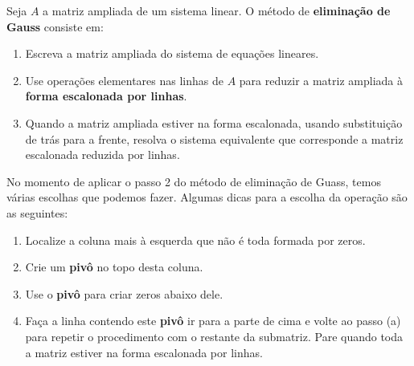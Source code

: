 \begin{definicao}
    Seja $A$ a matriz ampliada de um sistema linear. O método de \textbf{eliminação de Gauss} consiste em:
    \begin{enumerate}[label={\roman*})]
        \item Escreva a matriz ampliada do sistema de equações lineares.

        \item Use operações elementares nas linhas de $A$ para reduzir a matriz ampliada à \textbf{forma escalonada por linhas}.
        
        \item Quando a matriz ampliada estiver na forma escalonada, usando substituição de trás para a frente, resolva o sistema equivalente que corresponde a matriz escalonada reduzida por linhas.
    \end{enumerate}
\end{definicao}

\begin{observacao}
    No momento de aplicar o passo 2 do método de eliminação de Guass, temos várias escolhas que podemos fazer. Algumas dicas para a escolha da operação são as seguintes:
    \begin{enumerate}[label=({\alph*})]
        \item Localize a coluna mais à esquerda que não é toda formada por zeros.
        
        \item Crie um \textbf{pivô} no topo desta coluna.
         
        \item Use o \textbf{pivô} para criar zeros abaixo dele.

        \item Faça a linha contendo este \textbf{pivô} ir para a parte de cima e volte ao passo (a) para repetir o procedimento com o restante da submatriz. Pare quando toda a matriz estiver na forma escalonada por linhas.
    \end{enumerate}
\end{observacao}

